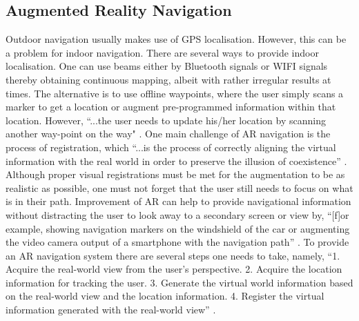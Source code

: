 \documentclass{aifyp}
\begin{document}
\subsection{Augmented Reality Navigation}
Outdoor navigation usually makes use of GPS localisation. However, this can be a problem for indoor navigation. There are several ways to provide indoor localisation. One can use beams either by Bluetooth signals or WIFI signals thereby obtaining continuous mapping, albeit with rather irregular results at times. The alternative is to use offline waypoints, where the user simply scans a marker to get a location or augment pre-programmed information within that location. However, ``...the user needs to update his/her location by scanning another way-point on the way" \cite{Bhorkar2017ASO}.
\newline
\newline
\indent One main challenge of AR navigation is the process of registration, which ``...is the process of correctly aligning the virtual information with the real world in order to preserve the illusion of coexistence” \cite{Bhorkar2017ASO}. Although proper visual registrations must be met for the augmentation to be as realistic as possible, one must not forget that the user still needs to focus on what is in their path.
\newline
\newline
\indent Improvement of AR can help to provide navigational information without distracting the user to look away to a secondary screen or view by, “[f]or example, showing navigation markers on the windshield of the car or augmenting the video camera output of a smartphone with the navigation path” \cite{Bhorkar2017ASO}. To provide an AR navigation system there are several steps one needs to take, namely, “1. Acquire the real-world view from the user’s perspective. 2. Acquire the location information for tracking the user. 3. Generate the virtual world information based on the real-world view and the location information. 4. Register the virtual information generated with the real-world view” \cite{Bhorkar2017ASO}.
\end{document}
